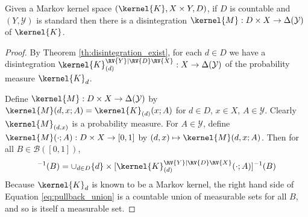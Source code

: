 \begin{theorem}\label{th:disintegration_exist_ker}
Given a Markov kernel space $(\kernel{K},X\times Y,D)$, if $D$ is countable and $(Y,\mathcal{Y})$ is standard then there is a disintegration $\kernel{M}:D\times X\to \Delta(\mathcal{Y})$ of $\kernel{K}$.
\end{theorem}

\begin{proof}
By Theorem \ref{th:disintegration_exist}, for each $d\in D$ we have a disintegration $\kernel{K}_{(d)}^{\RV{Y}|\RV{D}\RV{X}}:X\to \Delta(\mathcal{Y})$ of the probability measure $\kernel{K}_d$. 

Define $\kernel{M}:D\times X\to \Delta(\mathcal{Y})$ by $\kernel{M} (d,x;A) = \kernel{K}_{(d)} (x;A)$ for $d\in D$, $x\in X$, $A\in\mathcal{Y}$. Clearly $\kernel{M}_{(d,x)}$ is a probability measure. For $A\in \mathcal{Y}$, define $\kernel{M}(\cdot;A):D\times X\to [0,1]$ by $(d,x)\mapsto \kernel{M}(d,x;A)$. Then for all $B\in \mathcal{B}([0,1])$, 
\begin{align}
	[\kernel{M}(\cdot;A)]^{-1}(B) = \cup_{d\in D} \{d\}\times [\kernel{K}_{(d)}^{\RV{Y}|\RV{D}\RV{X}}(\cdot;A)]^{-1}(B)\label{eq:pullback_union}
\end{align}
Because $\kernel{K}_d$ is known to be a Markov kernel, the right hand side of Equation \ref{eq:pullback_union} is a countable union of measurable sets for all $B$, and so is itself a measurable set.
\end{proof}